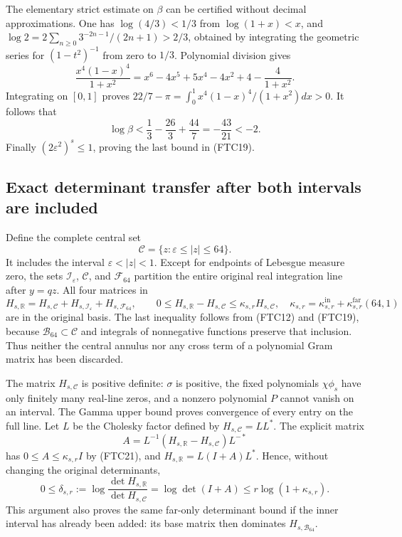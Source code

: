 The elementary strict estimate on $\beta$ can be certified without decimal
approximations.  One has $\log(4/3)<1/3$ from
$\log(1+x)<x$, and
$\log2=2\sum_{n\ge0}3^{-2n-1}/(2n+1)>2/3$, obtained by integrating the
geometric series for $(1-t^2)^{-1}$ from zero to $1/3$.
Polynomial division gives
\[
 \frac{x^4(1-x)^4}{1+x^2}
 =x^6-4x^5+5x^4-4x^2+4-\frac4{1+x^2}.
\]
Integrating on $[0,1]$ proves
$22/7-\pi=\int_0^1x^4(1-x)^4/(1+x^2)dx>0$.
It follows that
\[
 \log\beta<\frac13-\frac{26}3+\frac{44}7
 =-\frac{43}{21}<-2.
\]
Finally $(2\varepsilon^2)^s\le1$, proving the last bound in (FTC19).

\subsection{Exact determinant transfer after both intervals are included}

Define the complete central set
\begin{equation}
 \mathcal C=\{z:\varepsilon\le|z|\le64\}.
 \tag{FTC20}
\end{equation}
It includes the interval $\varepsilon<|z|<1$.  Except for endpoints of
Lebesgue measure zero, the sets $\mathcal I_\varepsilon$, $\mathcal C$,
and $\mathcal F_{64}$ partition the entire original real integration
line after $y=qz$.  All four matrices in
\begin{equation}
 H_{s,\mathbb R}=H_{s,\mathcal C}
 +H_{s,\mathcal I_\varepsilon}+H_{s,\mathcal F_{64}},\qquad
 0\le H_{s,\mathbb R}-H_{s,\mathcal C}
 \le\kappa_{s,r}H_{s,\mathcal C},\quad
 \kappa_{s,r}=\kappa_{s,r}^{\mathrm{in}}
 +\kappa_{s,r}^{\mathrm{far}}(64,1)
 \tag{FTC21}
\end{equation}
are in the original basis.  The last inequality follows from (FTC12) and
(FTC19), because $\mathcal B_{64}\subset\mathcal C$ and integrals of
nonnegative functions preserve that inclusion.  Thus neither the central
annulus nor any cross term of a polynomial Gram matrix has been discarded.

The matrix $H_{s,\mathcal C}$ is positive definite: $\sigma$ is positive,
the fixed polynomials $\chi\phi_s$ have only finitely many real-line
zeros, and a nonzero polynomial $P$ cannot vanish on an interval.
The Gamma upper bound proves convergence of every entry on the full line.
Let $L$ be the Cholesky factor defined by
$H_{s,\mathcal C}=LL^*$.  The explicit matrix
\[
 A=L^{-1}(H_{s,\mathbb R}-H_{s,\mathcal C})L^{-*}
\]
has $0\le A\le\kappa_{s,r}I$ by (FTC21), and
$H_{s,\mathbb R}=L(I+A)L^*$.  Hence, without changing the original
determinants,
\begin{equation}
 0\le\delta_{s,r}:=
 \log\frac{\det H_{s,\mathbb R}}{\det H_{s,\mathcal C}}
 =\log\det(I+A)\le r\log(1+\kappa_{s,r}).
 \tag{FTC22}
\end{equation}
This argument also proves the same far-only determinant bound if the
inner interval has already been added: its base matrix then dominates
$H_{s,\mathcal B_{64}}$.

